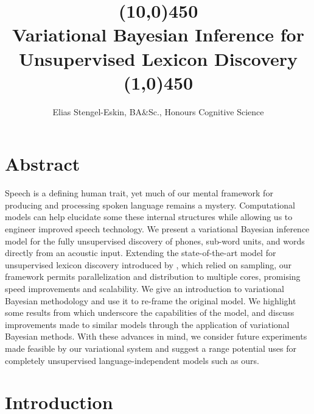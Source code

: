 \documentclass[12pt,letterpaper]{article}
\title{\vspace{-4em} \line(10,0){450}\\ Variational Bayesian Inference for Unsupervised Lexicon Discovery\\\vspace{-.7em} \line(1,0){450}}
\author{Elias Stengel-Eskin, BA\&Sc., Honours Cognitive Science}
\date{}
\begin{document}
\maketitle

\section{Abstract}

Speech is a defining human trait, yet much of our mental framework for producing and processing spoken language remains a mystery. Computational models can help elucidate some these internal structures while allowing us to engineer improved speech technology. We present a variational Bayesian inference model for the fully unsupervised discovery of phones, sub-word units, and words directly from an acoustic input. Extending the state-of-the-art model for unsupervised lexicon discovery introduced by \citet{lee:2015}, which relied on sampling, our framework permits  parallelization and distribution to multiple cores, promising speed improvements and scalability. We give an introduction to variational Bayesian methodology and use it to re-frame the original model. We highlight some results from \citet{lee:2015} which underscore the capabilities of the model, and discuss improvements made to similar models through the application of variational Bayesian methods. With these advances in mind, we consider future experiments made feasible by our variational system and suggest a range potential uses for completely unsupervised language-independent models such as ours. 

\section{Introduction}
\end{document}

